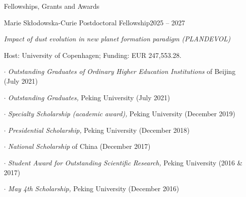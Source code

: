 \documentclass{resume} %
\begin{document}
\begin{rSection}{Fellowships, Grants and Awards} \itemsep -2pt

\begin{rSubsection}{Marie Skłodowska-Curie Postdoctoral Fellowship}{2025 -- 2027}{}{}
\item \emph{Impact of dust evolution in new planet formation paradigm (PLANDEVOL)}
\item Host: University of Copenhagen; Funding: EUR 247,553.28.
\end{rSubsection}

\item $\cdot$ \emph{Outstanding Graduates of Ordinary Higher Education Institutions} of Beijing (July 2021)
\item $\cdot$ \emph{Outstanding Graduates,} Peking University (July 2021)
\item $\cdot$ \emph{Specialty Scholarship (academic award),} Peking University (December 2019)
\item $\cdot$ \emph{Presidential Scholarship,} Peking University (December 2018)
\item $\cdot$ \emph{National Scholarship} of China (December 2017)
\item $\cdot$ \emph{Student Award for Outstanding Scientific Research,} Peking University (2016 \& 2017)
\item $\cdot$ \emph{May 4th Scholarship,} Peking University (December 2016)
\end{rSection}
\end{document}
